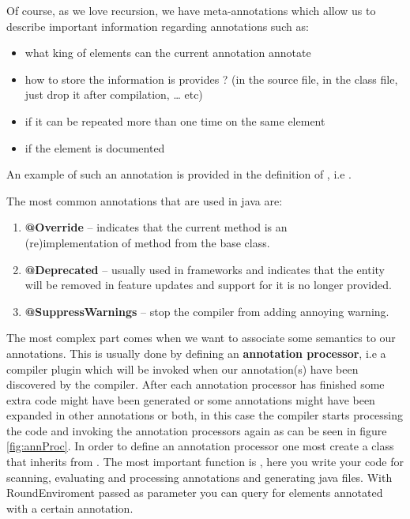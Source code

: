 	Of course, as we love recursion, we have meta-annotations which
allow us to describe important information regarding annotations such as:
	\begin{itemize}
	 	\item what king of elements can the current annotation annotate
	 	\item how to store the information is provides ? (in the source file, in the
class file, just drop it after compilation, \ldots{} etc)
	 	\item if it can be repeated more than one time on the same element
	 	\item if the element is  documented
	\end{itemize}
	An example of such an annotation is provided in the definition of
, i.e .
	
	The most common annotations that are used in java are:
	\begin{enumerate}
	  \item \textbf{@Override} -- indicates that the current method is an \\
 (re)implementation of method from the base class.
  
	  \item \textbf{@Deprecated} -- usually used in frameworks and indicates that
	  the entity will be removed in feature updates and support for it is no longer
 provided.
 
	  \item \textbf{@SuppressWarnings} -- stop the compiler from adding annoying
 warning.
	\end{enumerate}	

	The most complex part comes when we want to associate some semantics 
to our annotations. This is usually done by defining an 
\textbf{annotation processor}, i.e a compiler plugin which will be invoked when
our annotation(s) have been discovered by the compiler. After each 
annotation processor has finished some extra code might have been generated or
some annotations might have been expanded in other annotations or both, in 
this case the compiler starts processing the code and invoking the annotation
processors again as can be seen in figure \ref{fig:annProc}.
	 In order to define an annotation processor one most create a class that
inherits from . The
most important function is , here you write your code for scanning, evaluating 
and processing annotations and generating java files. With RoundEnviroment passed 
as parameter you can query for elements annotated with a certain annotation.
	
